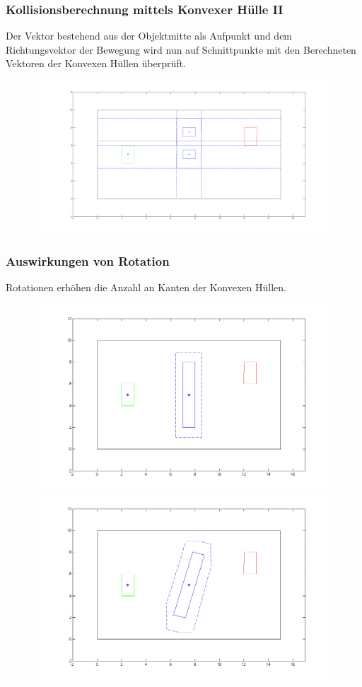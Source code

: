 \documentclass[final]{beamer}
\begin{document}
\begin{frame}
\frametitle{Kollisionsberechnung mittels Konvexer Hülle II}
Der Vektor bestehend aus der Objektmitte als Aufpunkt und dem Richtungsvektor der Bewegung wird nun auf Schnittpunkte mit den Berechneten Vektoren der Konvexen Hüllen überprüft.
\begin{figure}
\centering
\includegraphics[scale=0.1]{../thesis/riddle2HullCell}
\end{figure}
\end{frame}

\begin{frame}
\frametitle{Auswirkungen von Rotation}
Rotationen erhöhen die Anzahl an Kanten der Konvexen Hüllen.
\begin{figure}
\centering
\includegraphics[scale=0.2]{../thesis/rotHull}
\includegraphics[scale=0.2]{../thesis/rotatedHull}
\end{figure}
\end{frame}
\end{document}
